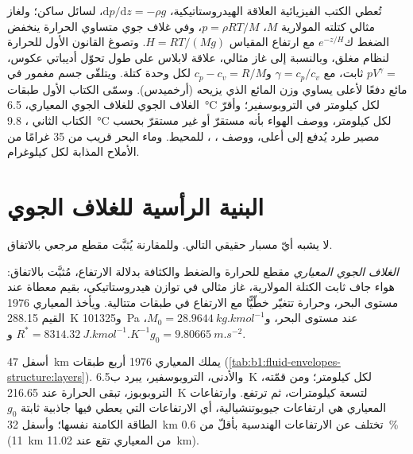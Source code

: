 \begin{recall}
تُعطي الكتب الفيزيائية العلاقة الهيدروستاتيكية، $\mathrm dp/\mathrm dz =
-\rho g$، لسائل ساكن؛ ولغاز مثالي كتلته المولارية $M$، $p = \rho R
T/M$، وفي غلاف جوي متساوي الحرارة ينخفض الضغط ك$e^{-z/H}$ مع ارتفاع المقياس $H = RT/(Mg)$. وتصوغ القانون الأول للحرارة لنظام مغلق، وبالنسبة إلى غاز مثالي، علاقة لابلاس على طول تحوّل أديباتي عكوس، $pV^{\gamma} = $ ثابت، مع $\gamma = c_p/c_v$ و$c_p - c_v
= R/M$ لكل وحدة كتلة. ويتلقّى جسم مغمور في مائع دفعًا لأعلى يساوي وزن المائع الذي يزيحه (أرخميدس). وسمّى الكتاب الأول طبقات الغلاف الجوي  للغلاف الجوي المعياري، \qty{6.5}{\celsius} لكل كيلومتر في التروبوسفير؛ وأقرّ الكتاب الثاني ، \qty{9.8}{\celsius} لكل كيلومتر، ووصف الهواء بأنه مستقرّ أو غير مستقرّ بحسب مصير طرد يُدفع إلى أعلى، ووصف ، ،   للمحيط. وماء البحر قريب من 35 غرامًا من الأملاح المذابة لكل كيلوغرام.
\end{recall}

\section{البنية الرأسية للغلاف الجوي}\label{sec:b1:fluid-envelopes-structure:atmosphere}

لا يشبه أيّ مسبار حقيقي التالي. وللمقارنة يُثبَّت مقطع مرجعي بالاتفاق.

\begin{definition}\label{def:b1:fluid-envelopes-structure:standard-atmosphere}
\emph{الغلاف الجوي المعياري} مقطع للحرارة والضغط والكثافة بدلالة الارتفاع، مُثبَّت بالاتفاق: هواء جاف ثابت الكتلة المولارية، غاز مثالي في توازن هيدروستاتيكي، بقيم معطاة عند مستوى البحر، وحرارة تتغيّر خطّيًّا مع الارتفاع في طبقات متتالية. ويأخذ المعياري 1976 القيم \qty{288.15}{K} و\qty{101325}{Pa} عند مستوى البحر، و$M_0 = \qty{28.9644}{kg.kmol^{-1}}$،
$R^* = \qty{8314.32}{J.kmol^{-1}.K^{-1}}$ و$g_0 = \qty{9.80665}{m.s^{-2}}$.
\end{definition}

أسفل \qty{47}{km} يملك المعياري 1976 أربع طبقات (\cref{tab:b1:fluid-envelopes-structure:layers}). والأدنى، التروبوسفير، يبرد ب\qty{6.5}{K} لكل كيلومتر؛ ومن قمّته، التروبوبوز، تبقى الحرارة عند \qty{216.65}{K} لتسعة كيلومترات، ثم ترتفع. وارتفاعات المعياري هي ارتفاعات جيوبوتنشيالية، أي الارتفاعات التي يعطي فيها جاذبية ثابتة $g_0$ الطاقة الكامنة نفسها؛ وأسفل \qty{32}{km} تختلف عن الارتفاعات الهندسية بأقلّ من \qty{0.6}{\percent} (\qty{11}{km} من المعياري تقع عند \qty{11.02}{km}).

